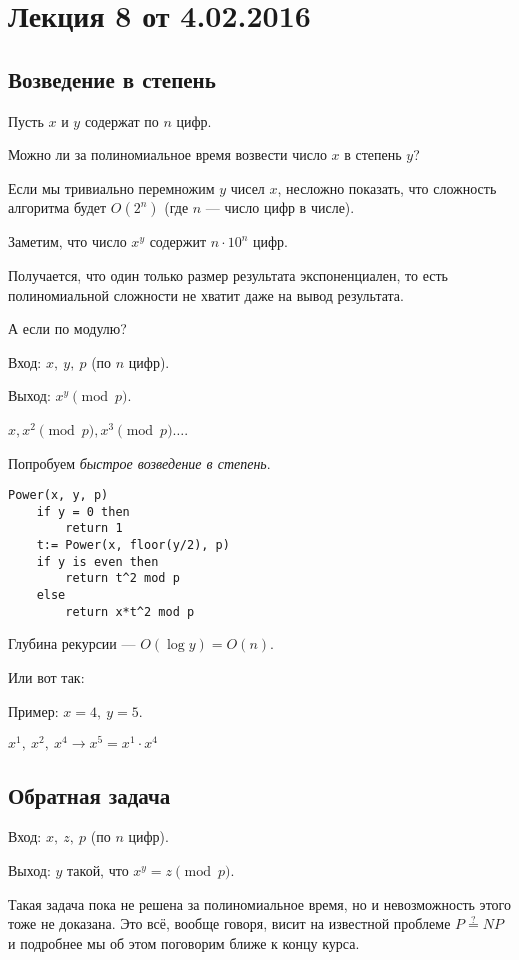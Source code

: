 
\let\epsilent\varepsilon


\section*{Лекция 8 от 4.02.2016}

\subsection{Возведение в степень}
Пусть $x$ и $y$ содержат по $n$ цифр.

Можно ли за полиномиальное время возвести число $x$ в степень $y$?

Если мы тривиально перемножим $y$ чисел $x$, несложно показать, что сложность алгоритма будет $O(2^n)$ (где $n$ --- число цифр в числе).

Заметим, что число $x^y$ содержит $n\cdot10^n$ цифр.

Получается, что один только размер результата экспоненциален, то есть полиномиальной сложности не хватит даже на вывод результата.

А если по модулю?

Вход: $x,\ y,\ p$ (по $n$ цифр).

Выход: $x^y \pmod{p}$.

$x, x^2\pmod{p}, x^3\pmod{p}\ldots$.

Попробуем \emph{быстрое возведение в степень}.

\begin{lstlisting}
Power(x, y, p)
    if y = 0 then
        return 1
    t:= Power(x, floor(y/2), p)
    if y is even then
        return t^2 mod p
    else
        return x*t^2 mod p
\end{lstlisting}

Глубина рекурсии --- $O(\log y) = O(n)$.

Или вот так:

Пример: $x=4,\ y=5$.

$x^1,\ x^2,\ x^4 \to x^5 = x^1\cdot x^4$

\subsection{Обратная задача}

Вход: $x,\ z,\ p$ (по $n$ цифр).

Выход: $y$ такой, что $x^y = z \pmod{p}$.

Такая задача пока не решена за полиномиальное время, но и невозможность этого тоже не доказана. Это всё, вообще говоря, висит на известной проблеме $P\mathrel{\overset{?}{=}} NP$ и подробнее мы об этом поговорим ближе к концу курса.

